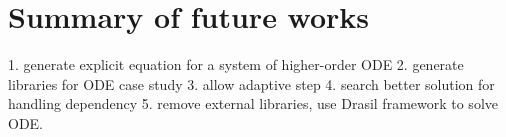 \chapter{Summary of future works}

1. generate explicit equation for a system of higher-order ODE
2. generate libraries for ODE case study
3. allow adaptive step
4. search better solution for handling dependency
5. remove external libraries, use Drasil framework to solve ODE.

